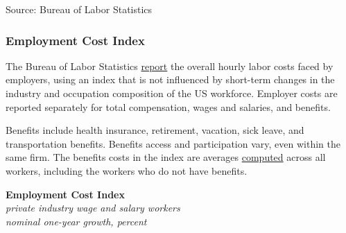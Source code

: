 \documentclass{report}
\makeatletter
\newcommand{\tbllink}[1]{\href{https://raw.githubusercontent.com/bdecon/US-chartbook/master/chartbook/data/#1}{\faTable}}
\newcommand*\short[1]{\expandafter\@gobbletwo\number\numexpr#1\relax}
\newcommand{\absnode}[3]{\node[below right, align=left] at (axis cs: #1,#2) {#3};}
\newcommand{\shdateaxisticks}{
		date coordinates in=x, axis line style={draw=none},
		xmax={2023-11-30},
		max space between ticks=40,	    
		xtick={{1990-01-01}, {1995-01-01}, {2000-01-01}, 
			{2005-01-01}, {2010-01-01}, {2015-01-01}, {2020-01-01}},
		minor xtick={},
		enlarge y limits={0.06}, enlarge x limits={0.01},
		xticklabel style={align=center, yshift=-2pt}, tick label style={inner sep=0pt},
		}
\newcommand{\bbar}[2]{extra #1 ticks = {{#2}}, extra #1 tick labels = ,
		extra #1 tick style = {grid=major, grid style={thick, black!25}},}
\newcommand{\stdline}[4]{\addplot[very thick, no markers, color=#1] 
		table [x=#2, y=#3, col sep=comma] {#4};	}
\newcommand{\rebars}{
		\fill[color=black!10] (axis cs:{2007-12-01},\pgfkeysvalueof{/pgfplots/ymin}) rectangle 
			(axis cs:{2009-07-01}, \pgfkeysvalueof{/pgfplots/ymax});
		\fill[color=black!10] (axis cs:{2001-03-01},\pgfkeysvalueof{/pgfplots/ymin}) rectangle 
			(axis cs:{2001-11-01}, \pgfkeysvalueof{/pgfplots/ymax});
		\fill[color=black!10] (axis cs:{2020-02-01},\pgfkeysvalueof{/pgfplots/ymin}) rectangle 
			(axis cs:{2020-05-01}, \pgfkeysvalueof{/pgfplots/ymax});}
\makeatother
\begin{document}
{\begin{minipage}{0.76\textwidth} 
\footnotesize{Source: Bureau of Labor Statistics} \hfill \tbllink{ahe_ind.csv}
\end{minipage}
\newpage
\vspace*{-11mm}

\begin{minipage}{0.76\textwidth}  
\subsubsection*{Employment Cost Index}
\small The Bureau of Labor Statistics \href{https://www.bls.gov/news.release/eci.nr0.htm}{report} the overall hourly labor costs faced by employers, using an index that is not influenced by short-term changes in the industry and occupation composition of the US workforce. Employer costs are reported separately for total compensation, wages and salaries, and benefits.

Benefits include health insurance, retirement, vacation, sick leave, and transportation benefits. Benefits access and participation vary, even within the same firm. The benefits costs in the index are averages \href{https://www.bls.gov/opub/mlr/cwc/benefit-cost-concepts-and-the-limitations-of-ecec-measurement.pdf}{computed} across all workers, including the workers who do not have benefits. 
\end{minipage}

\begin{minipage}{0.38\textwidth}
\normalsize \textbf{Employment Cost Index}\\
\footnotesize{\textit{private industry wage and salary workers}}\\
\footnotesize{\textit{nominal one-year growth, percent}}
\vspace{2.7cm}

\hspace{1mm} 


\end{minipage}}
\end{document}
